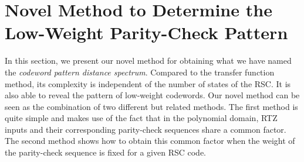 \section{Novel Method to Determine the Low-Weight Parity-Check Pattern}
\label{sec3}
In this section, we present our novel method for obtaining what we have named the \textit{codeword pattern distance spectrum}. Compared to the transfer function method, its complexity is independent of the number of states of the RSC. It is also able to reveal the pattern of low-weight codewords. Our novel method can be seen as the combination of two different but related methods. The first method is quite simple and makes use of the fact that in the polynomial domain, RTZ inputs and their corresponding parity-check sequences share a common factor. 
The second method shows how to obtain this common factor when the weight of the parity-check sequence is fixed for a given RSC code. 












